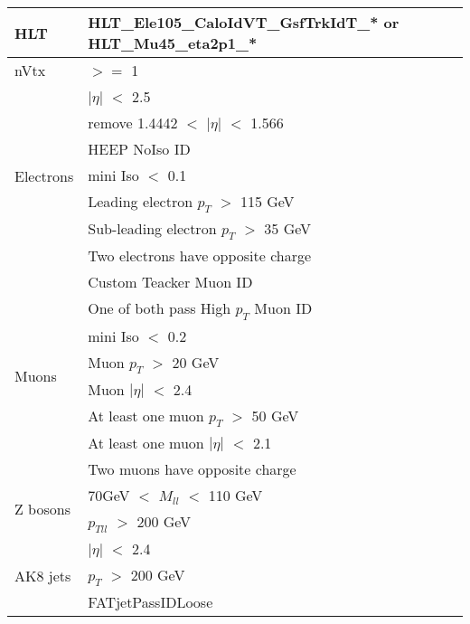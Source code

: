 \documentclass[a0,portrait]{a0poster}
\begin{document}
\begin{multicols}{2}
  \begin{center}
    \begin{small}
      \begin{tabular}[t]{ | l | l | }
        \hline
        HLT       
        & HLT\_Ele105\_CaloIdVT\_GsfTrkIdT\_* or HLT\_Mu45\_eta2p1\_*  \\
        \hline
        nVtx 
        & $>=$ 1                                         \\
        \hline
        \multirow{7}{*}{Electrons} 
        & $|\eta|$ $<$ 2.5                               \\
        & remove 1.4442 $<$ $|\eta|$ $<$ 1.566           \\
        & HEEP NoIso ID                                  \\
        & mini Iso $<$ 0.1                               \\
        & Leading electron $p_T$ $>$ 115 GeV             \\
        & Sub-leading electron $p_T$ $>$ 35 GeV          \\
        & Two electrons have opposite charge             \\
        \hline
        \multirow{8}{*}{Muons}
        & Custom Teacker Muon ID                         \\ 
        & One of both pass High $p_T$ Muon ID            \\
        & mini Iso $<$ 0.2                               \\
        & Muon $p_T$ $>$ 20 GeV                          \\
        & Muon $|\eta|$ $<$ 2.4                          \\
        & At least one muon $p_T$ $>$ 50 GeV             \\
        & At least one muon $|\eta|$ $<$ 2.1             \\
        & Two muons have opposite charge                 \\
        \hline
        \multirow{2}{*}{Z bosons}
        & 70GeV $<$ $M_{ll}$ $<$ 110 GeV                 \\
        & $p_{Tll}$ $>$ 200 GeV                          \\
        \hline
        \multirow{6}{*}{AK8 jets}
        & $|\eta|$ $<$ 2.4                               \\ 
        & $p_T$ $>$ 200 GeV                              \\
        & FATjetPassIDLoose                              \\

\end{tabular}
\end{small}
\end{center}
\end{multicols}
\end{document}
